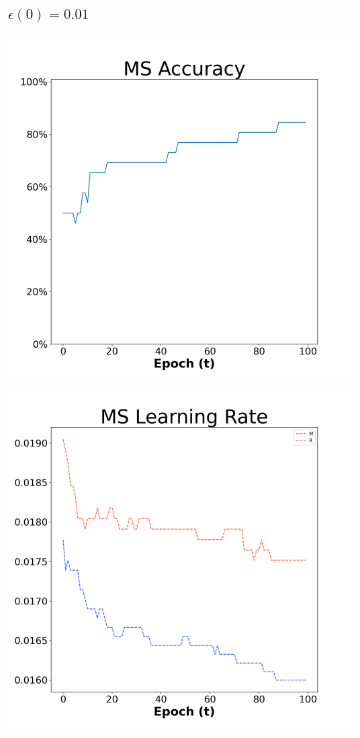 \begin{figure}[H]
\begin{subfigure}{0.3\textwidth}
  \caption{$\epsilon(0)=0.01$}
\end{subfigure}\hfil %
\begin{subfigure}{0.3\textwidth}
  \includegraphics[width=\linewidth]{images/exper1/Sonar/MS_0.03_acc.png}
  \includegraphics[width=\linewidth]{images/exper1/Sonar/MS_0.03_lr.png}

\end{subfigure}
\end{figure}
